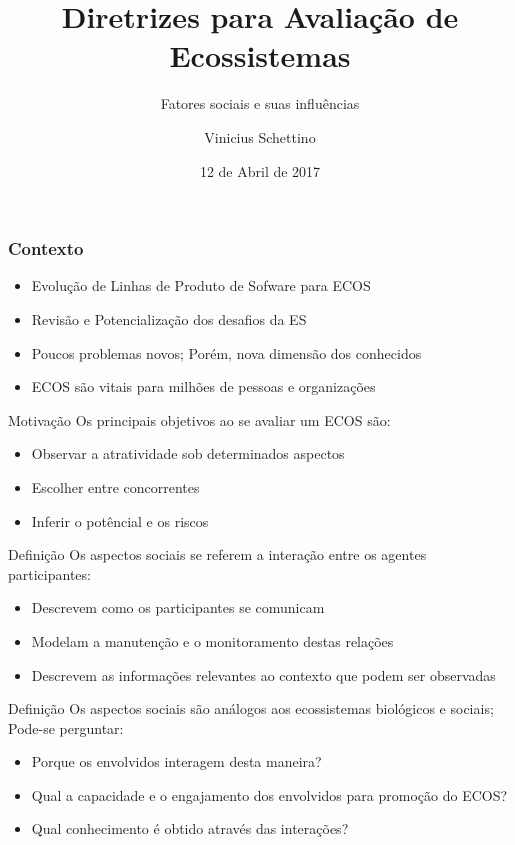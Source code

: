 \documentclass[10pt, compress,british,xcolor={svgnames,dvipsnames,x11names},trans]{beamer}
\title{Diretrizes para Avaliação de Ecossistemas}
\subtitle{Fatores sociais e suas influências}
\date{12 de Abril de 2017}
\author{Vinicius Schettino}
\institute{
Departamento de Ciência da Computação\\
Instituto de Ciências Exatas (ICE)\\
Universidade Federal de Juiz de Fora
}
\begin{document}
\maketitle

\begin{frame}[label=LO]
\frametitle{Contexto}

\begin{itemize}
\item Evolução de Linhas de Produto de Sofware para ECOS
\item Revisão e Potencialização dos desafios da ES
\item Poucos problemas novos; Porém, nova dimensão dos conhecidos
\item ECOS são vitais para milhões de pessoas e organizações
\end{itemize}
\end{frame}

\begin{frame}{Motivação}
  Os principais objetivos ao se avaliar um ECOS são:

	\begin{itemize}
		\item Observar a atratividade sob determinados aspectos
		\item Escolher entre concorrentes
		\item Inferir o potêncial e os riscos
	\end{itemize}
\end{frame}


\begin{frame}{Definição}
  Os aspectos sociais se referem a interação entre os agentes participantes:
	\begin{itemize}
		\item Descrevem como os participantes se comunicam
		\item Modelam a manutenção e o monitoramento destas relações
		\item Descrevem as informações relevantes ao contexto que podem ser observadas
	\end{itemize}
\end{frame}

\begin{frame}{Definição}
  Os aspectos sociais são análogos aos ecossistemas biológicos e sociais; Pode-se perguntar:
	\begin{itemize}
		\item Porque os envolvidos interagem desta maneira?
		\item Qual a capacidade e o engajamento dos envolvidos para promoção do ECOS?
		\item Qual conhecimento é obtido através das interações?
	\end{itemize}
\end{frame}
\end{document}
